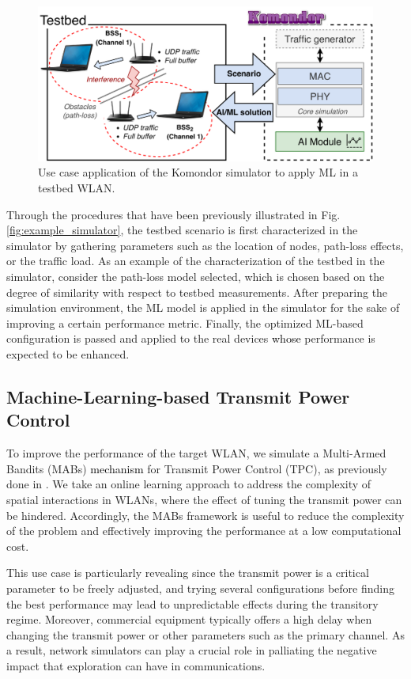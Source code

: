 \documentclass[journal]{IEEEtran}
\begin{document}
	\begin{figure}[ht!]
		\centering
		\includegraphics[width=\columnwidth]{testbed2.pdf}
		\caption{Use case application of the Komondor simulator to apply ML in a testbed WLAN.}
		\label{fig:testbed}
	\end{figure}

	Through the procedures that have been previously illustrated in Fig. \ref{fig:example_simulator}, the testbed scenario is first characterized in the simulator by gathering parameters such as the location of nodes, path-loss effects, or the traffic load. As an example of the characterization of the testbed in the simulator, consider the path-loss model selected, which is chosen based on the degree of similarity with respect to testbed measurements. After preparing the simulation environment, the ML model is applied in the simulator for the sake of improving a certain performance metric. Finally, the optimized ML-based configuration is passed and applied to the real devices \textcolor{black}{whose} performance is expected to be enhanced.
	
	\subsection{Machine-Learning-based Transmit Power Control}
	To improve the performance of the target WLAN, we simulate a Multi-Armed Bandits (MABs) \textcolor{black}{mechanism} for Transmit Power Control (TPC), as previously done in \cite{wilhelmi}. We take an online learning approach to address the complexity of spatial interactions in WLANs, where the effect of tuning the transmit power can be hindered. Accordingly, the MABs framework is useful to reduce the complexity of the problem and effectively improving the performance at a low computational cost. 
	
	This use case is particularly revealing since the transmit power is a critical parameter to be freely adjusted, and trying several configurations before finding the best performance may lead to unpredictable effects during the transitory regime. Moreover, commercial equipment typically offers a high delay when changing the transmit power or other parameters such as the primary channel. As a result, network simulators can play a crucial role in palliating the negative impact that exploration can have in communications.
	
\end{document}
